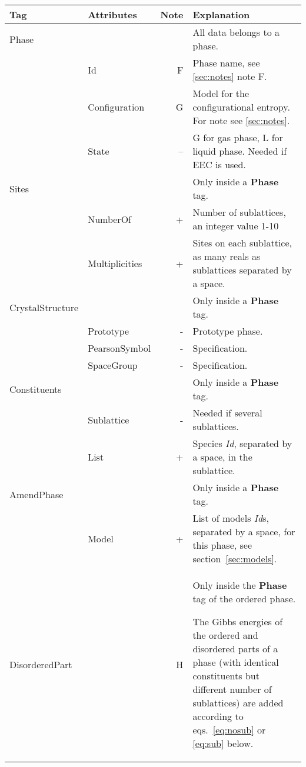 \documentclass{article}
\begin{document}
\begin{tabular}{|p{} p{} r p{}|}\hline
  Tag & Attributes & Note & Explanation\\\hline

  Phase & && All data belongs to a phase.\\
       & Id & F & Phase name, see \ref{sec:notes} note F. \\
       & Configuration & G & Model for the configurational entropy.  For note see \ref{sec:notes}.\\
       & State & -- & G for gas phase, L for liquid phase.  Needed if EEC is used.\\\hline

  Sites & && Only inside a {\bf Phase} tag.\\
        & NumberOf & + & Number of sublattices, an integer value 1-10 \\
        & Multiplicities & + & Sites on each sublattice, as many reals as sublattices separated by a space.\\\hline

  CrystalStructure & && Only inside a {\bf Phase} tag.\\
        & Prototype & - & Prototype phase.\\
        & PearsonSymbol & - & Specification.\\
        & SpaceGroup & - & Specification.\\\hline

  Constituents & && Only inside a {\bf Phase} tag.\\
               & Sublattice & - & Needed if several sublattices.\\
               & List & + & Species {\em Id}, separated by a space, in the sublattice.\\\hline

  AmendPhase & && Only inside a {\bf Phase} tag.\\
        & Model & + & List of models {\em Id}s, separated by a space, for this
             phase, see section~\ref{sec:models}.\\\hline

  DisorderedPart & & H & Only inside the {\bf Phase} tag of the ordered phase.

              The Gibbs energies of the ordered and disordered parts
              of a phase (with identical constituents but different
              number of sublattices) are added according to
              eqs.~\ref{eq:nosub} or \ref{eq:sub} below.  


\end{tabular}
\end{document}
